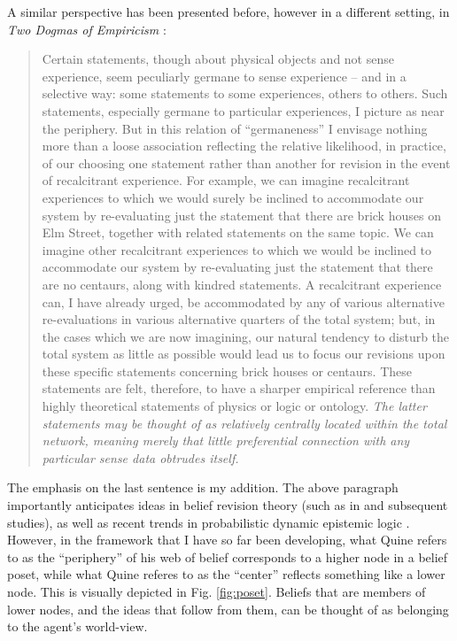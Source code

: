 \documentclass[11pt]{article}
\numberwithin{equation}{subsection}
\begin{document}
A similar perspective has been presented before, however in a
different setting, in \emph{Two Dogmas of Empiricism}
\citep{quine_two_1951}:
\begin{quote}
{Certain statements, though about physical objects and not sense
  experience, seem peculiarly germane to sense experience -- and in a
  selective way: some statements to some experiences, others to
  others. Such statements, especially germane to particular
  experiences, I picture as near the periphery. But in this relation
  of ``germaneness'' I envisage nothing more than a loose association
  reflecting the relative likelihood, in practice, of our choosing one
  statement rather than another for revision in the event of
  recalcitrant experience. For example, we can imagine recalcitrant
  experiences to which we would surely be inclined to accommodate our
  system by re-evaluating just the statement that there are brick
  houses on Elm Street, together with related statements on the same
  topic. We can imagine other recalcitrant experiences to which we
  would be inclined to accommodate our system by re-evaluating just
  the statement that there are no centaurs, along with kindred
  statements. A recalcitrant experience can, I have already urged, be
  accommodated by any of various alternative re-evaluations in various
  alternative quarters of the total system; but, in the cases which we
  are now imagining, our natural tendency to disturb the total system
  as little as possible would lead us to focus our revisions upon
  these specific statements concerning brick houses or centaurs. These
  statements are felt, therefore, to have a sharper empirical
  reference than highly theoretical statements of physics or logic or
  ontology. \emph{The latter statements may be thought of as
    relatively centrally located within the total network, meaning
    merely that little preferential connection with any particular
    sense data obtrudes itself.} }
\end{quote}

The emphasis on the last sentence is my addition.  The above paragraph
importantly anticipates ideas in belief revision theory (such as in
\citet{alchourron_logic_1985} and subsequent studies), as well as
recent trends in probabilistic dynamic epistemic logic \citep[such as
in][etc.]{van_benthem_conditional_2003,van_benthem_dynamic_2009,baltag_probabilistic_2008,kooi_probabilistic_2003}.
However, in the framework that I have so far been developing, what
Quine refers to as the ``periphery'' of his web of belief corresponds
to a higher node in a belief poset, while what Quine referes to as the
``center'' reflects something like a lower node.  This is visually
depicted in Fig. \ref{fig:poset}.  Beliefs that are members of lower
nodes, and the ideas that follow from them, can be thought of as
belonging to the agent's world-view.
\end{document}
